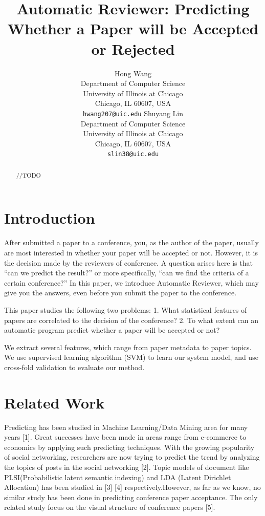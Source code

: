 \documentclass[11pt,letterpaper]{article}
\title{Automatic Reviewer: Predicting Whether a Paper will be Accepted or Rejected}
\author{Hong Wang\\
	    Department of Computer Science\\
	    University of Illinois at Chicago\\
	    Chicago, IL 60607, USA\\
	    {\tt hwang207@uic.edu}
	  \And
	Shuyang Lin\\
  	 Department of Computer Science\\
	    University of Illinois at Chicago\\
	    Chicago, IL 60607, USA\\
	  {\tt slin38@uic.edu}}
\date{}
\begin{document}
\maketitle
\begin{abstract}
	//TODO
\end{abstract}

\section{Introduction}
After submitted a paper to a conference, you, as the author of the paper, usually are most interested in whether your paper will be accepted or not. However, it is the decision made by the reviewers of conference. A question arises here is that ``can we predict the result?'' or more specifically, ``can we find the criteria of a certain conference?'' In this paper, we introduce Automatic Reviewer, which may give you the answers, even before you submit the paper to the conference. 

This paper studies the following two problems: 1. What statistical features of papers are correlated to the decision of the conference? 2. To what extent can an automatic program predict whether a paper will be accepted or not?

We extract several features, which range from paper metadata to paper topics. We use supervised learning algorithm (SVM) to learn our system model, and use cross-fold validation to evaluate our method. 

\section{Related Work}

Predicting has been studied in Machine Learning/Data Mining area for many years [1]. Great successes have been made in areas range from e-commerce to economics by applying such predicting techniques. With the growing popularity of social networking, researchers are now trying to predict the trend by analyzing the topics of posts in the social networking [2]. Topic models of document like PLSI(Probabilistic latent semantic indexing) and LDA (Latent Dirichlet Allocation) has been studied in [3] [4] respectively.However, as far as we know, no similar study has been done in predicting conference paper acceptance. The only related study focus on the visual structure of conference papers [5]. 
\end{document}
